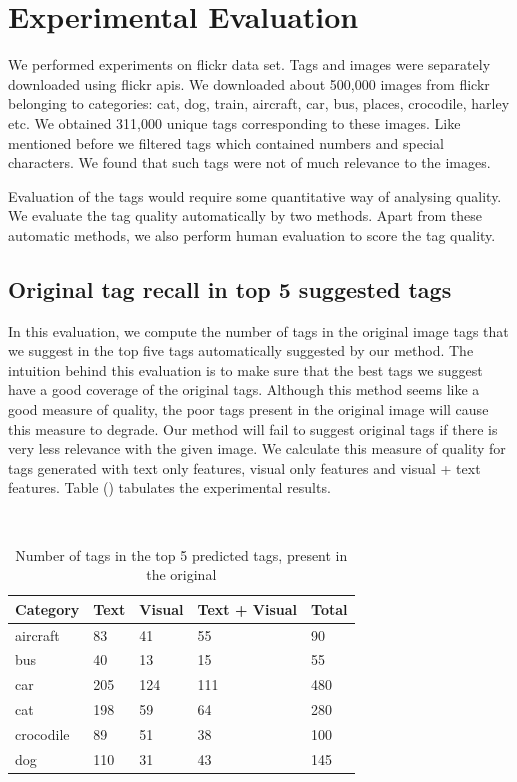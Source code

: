 \documentclass[12pt]{article}
\begin{document}
\section{Experimental Evaluation}
We performed experiments on flickr data set. Tags and images were separately downloaded using
flickr apis. We downloaded about 500,000 images from flickr belonging to categories: cat,
dog, train, aircraft, car, bus, places, crocodile, harley etc. We obtained 311,000 unique tags
corresponding to these images. Like mentioned before we filtered tags which contained numbers
and special characters. We found that such tags were not of much relevance to the images.

Evaluation of the tags would require some quantitative way of analysing quality. We evaluate
the tag quality automatically by two methods. Apart from these automatic methods, we also
perform human evaluation to score the tag quality.

\subsection{Original tag recall in top 5 suggested tags}
In this evaluation, we compute the number of tags in the original image tags that we suggest
in the top five tags automatically suggested by our method. The intuition behind this evaluation
is to make sure that the best tags we suggest have a good coverage of the original tags. Although
this method seems like a good measure of quality, the poor tags present in the original image
will cause this measure to degrade. Our method will fail to suggest original tags if there is
very less relevance with the given image. We calculate this measure of quality for tags generated
with text only features, visual only features and visual + text features. Table () tabulates the
experimental results.


\begin{table}
  \caption{Number of tags in the top 5 predicted tags, present in
  the original}
  \begin{center}
    \begin{tabular}{|l l l l l|}
\hline
Category & Text & Visual & Text + Visual & Total \\
\hline
aircraft & 83 & 41 & 55 & 90 \\
bus & 40 & 13 & 15 & 55 \\
car & 205 & 124 & 111 & 480 \\
cat & 198 & 59 & 64 & 280 \\
crocodile & 89 & 51 & 38 & 100 \\
dog & 110 & 31 & 43 & 145 \\
\hline
\end{tabular}
\end{center}
\end{table}
\end{document}
